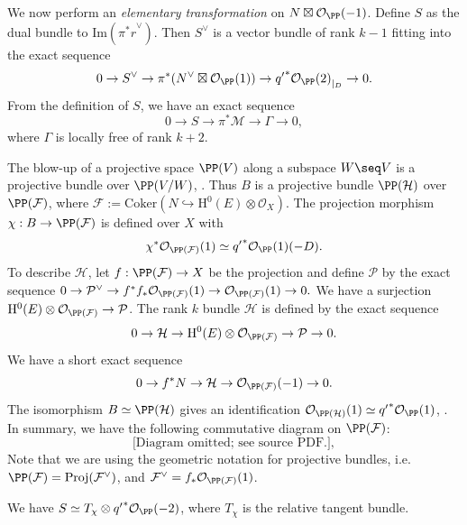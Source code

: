 We now perform an \emph{elementary transformation} on  $N  \boxtimes \mathcal{O}_{\PP}(-1)$. Define $S$ as the dual bundle to $\mathrm{Im}({\pi^*r}^{\vee})$. Then $S^{\vee}$ is a vector bundle of rank $k-1$ fitting into the exact sequence
$$0 \to S^{\vee} \to \pi^* (N^{\vee} \boxtimes \mathcal{O}_{\PP}(1)) \to {{q'}^* \mathcal{O}_{\PP}(2)}_{|_D} \to 0.$$
From the definition of $S$, we have an exact sequence $$0 \to S \to \pi^* \mathcal{M} \to \Gamma \to 0,$$ where $\Gamma$ is locally free of rank $k+2$.

The blow-up of a projective space $\PP(V)$ along a subspace $W \seq V$ is a projective bundle over $\PP(V/W)$, \cite[\S 9.3.2]{3264}. Thus $B$ is a projective bundle $\PP(\mathcal{H})$ over $\PP(\mathcal{F})$, where $\mathcal{F}:=\mathrm{Coker}(N \hookrightarrow \mathrm{H}^0(E) \otimes \mathcal{O}_X)$. %
The projection morphism ${\chi: B \to \PP(\mathcal{F})}$ is defined over $X$ with $$\chi^* \mathcal{O}_{\PP(\mathcal{F})}(1) \simeq {q'}^*\mathcal{O}_{\PP}(1)(-D).$$ To describe $\mathcal{H}$, let $f: \PP(\mathcal{F}) \to X$ be the projection and define $\mathcal{P}$ by the exact sequence $0 \to \mathcal{P}^{\vee} \to f^*f_* \mathcal{O}_{\PP(\mathcal{F})}(1) \to \mathcal{O}_{\PP(\mathcal{F})}(1) \to 0.$ We have a surjection $\mathrm{H}^0(E) \otimes \mathcal{O}_{\PP(\mathcal{F})} \to \mathcal{P}$. The rank $k$ bundle $\mathcal{H}$ is defined by the exact sequence
$$0 \to \mathcal{H} \to \mathrm{H}^0(E) \otimes \mathcal{O}_{\PP(\mathcal{F})}\to \mathcal{P} \to 0.$$
We have a short exact sequence
$$ 0 \to f^* N \to \mathcal{H} \to \mathcal{O}_{\PP(\mathcal{F})}(-1) \to 0.$$
The isomorphism $B \simeq \PP(\mathcal{H})$ gives an identification $\mathcal{O}_{\PP(\mathcal{H})}(1) \simeq {q'}^*\mathcal{O}_{\PP}(1)$, \cite[Prop.\ 9.11]{3264}.
In summary, we have the following commutative diagram on $\PP(\mathcal{F})$:
{\small{$$\text{[Diagram omitted; see source PDF.]},$$}}
Note that we are using the geometric notation for projective bundles, i.e.\ $\PP(\mathcal{F})=\mathrm{Proj}(\mathcal{F}^{\vee})$, and $\mathcal{F}^{\vee}=f_*\mathcal{O}_{\PP(\mathcal{F})}(1)$.
\begin{lem}
\notready
We have  $S \simeq T_{\chi} \otimes {q'}^*\mathcal{O}_{\PP}(-2)$, where $T_{\chi}$ is the relative tangent bundle.
\end{lem}
